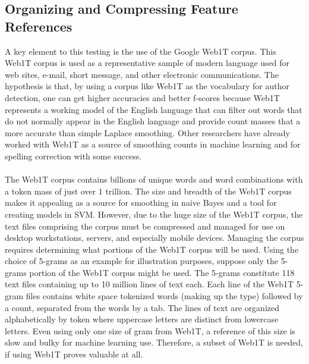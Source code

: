 	\subsection{Organizing and Compressing Feature References} A key element to this testing is the use of the Google Web1T corpus.  This Web1T corpus is used as a representative sample of modern language used for web sites, e-mail, short message, and other electronic communications.  The hypothesis is that, by using a corpus like Web1T as the vocabulary for author detection, one can get higher accuracies and better f-scores because Web1T represents a working model of the English language that can filter out words that do not normally appear in the English language and provide count masses that a more accurate than simple Laplace smoothing. Other researchers have already worked with Web1T as a source of smoothing counts in machine learning \cite{yuret_smoothing_2008} and for spelling correction\cite{islam_real-word_2009} with some success. 
	\paragraph*{}The Web1T corpus contains billions of unique words and word combinations with a token mass of just over 1 trillion.  The size and breadth of the Web1T corpus makes it appealing as a source for smoothing in naive Bayes and a tool for creating models in SVM. However, due to the huge size of the Web1T corpus, the text files comprising the corpus must be compressed and managed for use on desktop workstations, servers, and especially mobile devices.  Managing the corpus requires determining what portions of the Web1T corpus will be used.  Using the choice of 5-grams as an example for illustration purposes, suppose only the 5-grams portion of the Web1T corpus might be used.  The 5-grams constitute 118 text files containing up to 10 million lines of text each. Each line of the Web1T 5-gram files contains white space tokenized words (making up the type) followed by a count, separated from the words by a tab.  The lines of text are organized alphabetically by token where uppercase letters are distinct from lowercase letters. Even using only one size of gram from Web1T, a reference of this size is slow and bulky for machine learning use.  Therefore, a subset of Web1T is needed, if using Web1T proves valuable at all.
